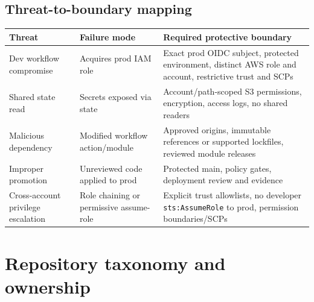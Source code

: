 \documentclass[10pt,letterpaper]{article}
\begin{document}
\subsection{Threat-to-boundary mapping}
\begin{center}\small\begin{tabularx}{\linewidth}{@{}>{\raggedright\arraybackslash}p{30mm}>{\raggedright\arraybackslash}X >{\raggedright\arraybackslash}X@{}}\toprule
Threat & Failure mode & Required protective boundary\\\midrule
Dev workflow compromise & Acquires prod IAM role & Exact prod OIDC subject, protected environment, distinct AWS role and account, restrictive trust and SCPs\\
Shared state read & Secrets exposed via state & Account/path-scoped S3 permissions, encryption, access logs, no shared readers\\
Malicious dependency & Modified workflow action/module & Approved origins, immutable references or supported lockfiles, reviewed module releases\\
Improper promotion & Unreviewed code applied to prod & Protected main, policy gates, deployment review and evidence\\
Cross-account privilege escalation & Role chaining or permissive assume-role & Explicit trust allowlists, no developer \texttt{sts:AssumeRole} to prod, permission boundaries/SCPs\\\bottomrule
\end{tabularx}\end{center}

\section{Repository taxonomy and ownership}
\end{document}
